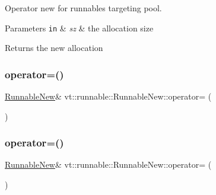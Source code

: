 Operator new for runnables targeting pool. 


\begin{DoxyParams}[1]{Parameters}
\mbox{\tt in}  & {\em sz} & the allocation size\\
\hline
\end{DoxyParams}
\begin{DoxyReturn}{Returns}
the new allocation 
\end{DoxyReturn}
\mbox{\label{structvt_1_1runnable_1_1_runnable_new_a12c7ddbd735a9bf704b06ecea7c26e60}} 
\subsubsection{\texorpdfstring{operator=()}{operator=()}\hspace{0.1cm}{\footnotesize\ttfamily [1/2]}}
{\footnotesize\ttfamily \hyperlink{structvt_1_1runnable_1_1_runnable_new}{Runnable\+New}\& vt\+::runnable\+::\+Runnable\+New\+::operator= (\begin{DoxyParamCaption}\item[{\hyperlink{structvt_1_1runnable_1_1_runnable_new}{Runnable\+New} const \&}]{ }\end{DoxyParamCaption})\hspace{0.3cm}{\ttfamily [delete]}}

\mbox{\label{structvt_1_1runnable_1_1_runnable_new_a3561cbcbc3197074cded8da204e98924}} 
\subsubsection{\texorpdfstring{operator=()}{operator=()}\hspace{0.1cm}{\footnotesize\ttfamily [2/2]}}
{\footnotesize\ttfamily \hyperlink{structvt_1_1runnable_1_1_runnable_new}{Runnable\+New}\& vt\+::runnable\+::\+Runnable\+New\+::operator= (\begin{DoxyParamCaption}\item[{\hyperlink{structvt_1_1runnable_1_1_runnable_new}{Runnable\+New} \&\&}]{ }\end{DoxyParamCaption})\hspace{0.3cm}{\ttfamily [default]}}

